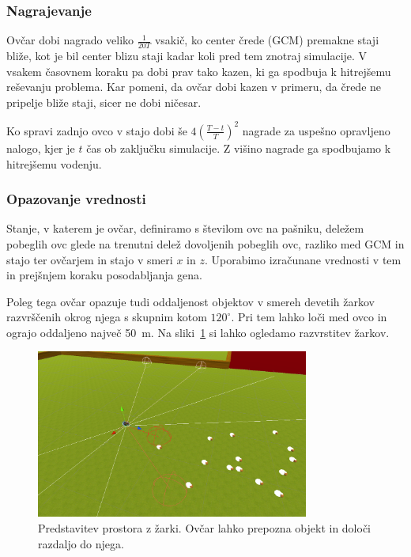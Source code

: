 \subsubsection{Nagrajevanje}

Ovčar dobi nagrado veliko $\frac{1}{20T}$ vsakič, ko center črede (GCM) premakne staji bliže, kot je bil center blizu staji kadar koli pred tem znotraj simulacije. V vsakem časovnem koraku pa dobi prav tako kazen, ki ga spodbuja k hitrejšemu reševanju problema. Kar pomeni, da ovčar dobi kazen v primeru, da črede ne pripelje bliže staji, sicer ne dobi ničesar.

Ko spravi zadnjo ovco v stajo dobi še $4(\frac{T - t}{T})^2$ nagrade za uspešno opravljeno nalogo, kjer je $t$ čas ob zaključku simulacije. Z višino nagrade ga spodbujamo k hitrejšemu vodenju.

\subsubsection{Opazovanje vrednosti}

Stanje, v katerem je ovčar, definiramo s številom ovc na pašniku, deležem pobeglih ovc glede na trenutni delež dovoljenih pobeglih ovc, razliko med GCM in stajo ter ovčarjem in stajo v smeri $x$ in $z$. Uporabimo izračunane vrednosti v tem in prejšnjem koraku posodabljanja gena.

Poleg tega ovčar opazuje tudi oddaljenost objektov v smereh devetih žarkov razvrščenih okrog njega s skupnim kotom $120^\circ$. Pri tem lahko loči med ovco in ograjo oddaljeno največ 50~m. Na sliki~\ref{fig:zarki} si lahko ogledamo razvrstitev žarkov.

\begin{figure}[ht]  %
	\centering
	\includegraphics[width=0.8\textwidth]{../poglavja/images/zarki.png}
	\caption[Predstavitev prostora z žarki]{Predstavitev prostora z žarki. Ovčar lahko prepozna objekt in določi razdaljo do njega.} %
	\label{fig:zarki}
\end{figure}

